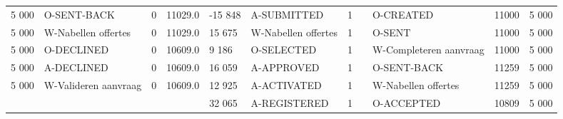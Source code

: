 \begin{tabular}{lllllllllll}
5 000 & O-SENT-BACK & 0 & 11029.0 & -15 848 & A-SUBMITTED & 1 &  & O-CREATED & 11000 & 5 000 \\
5 000 & W-Nabellen offertes & 0 & 11029.0 & 15 675 & W-Nabellen offertes & 1 &  & O-SENT & 11000 & 5 000 \\
5 000 & O-DECLINED & 0 & 10609.0 & 9 186 & O-SELECTED & 1 &  & W-Completeren aanvraag & 11000 & 5 000 \\
5 000 & A-DECLINED & 0 & 10609.0 & 16 059 & A-APPROVED & 1 &  & O-SENT-BACK & 11259 & 5 000 \\
5 000 & W-Valideren aanvraag & 0 & 10609.0 & 12 925 & A-ACTIVATED & 1 &  & W-Nabellen offertes & 11259 & 5 000 \\
 &  &  &  & 32 065 & A-REGISTERED & 1 &  & O-ACCEPTED & 10809 & 5 000 \\
\bottomrule
\end{tabular}
